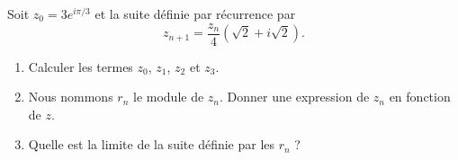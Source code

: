 
\begin{exercice}\label{exosmath-0415}

    Soit \( z_0=3 e^{i\pi/3}\) et la suite définie par récurrence par
    \begin{equation}
        z_{n+1}=\frac{ z_n }{ 4 }\left( \sqrt{2}+i\sqrt{2} \right).
    \end{equation}
    \begin{enumerate}
        \item
            Calculer les termes \( z_0\), \( z_1\), \( z_2\) et \( z_3\).
        \item
            Nous nommons \( r_n\) le module de \( z_n\). Donner une expression de \( z_n\) en fonction de \( z\).
        \item
            Quelle est la limite de la suite définie par les \( r_n\) ?
    \end{enumerate}

\end{exercice}
